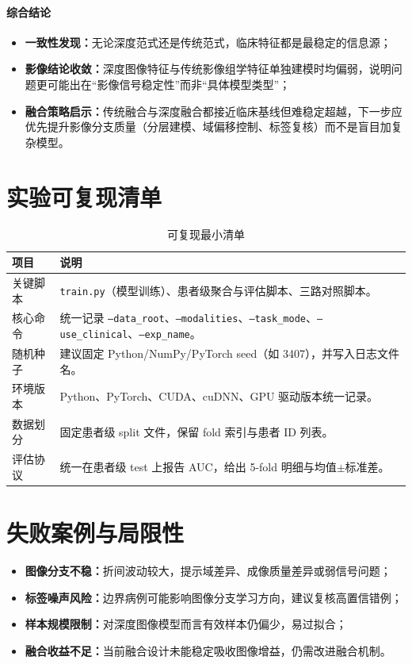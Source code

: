 \documentclass[12pt,a4paper]{ctexart}
\begin{document}
\paragraph{综合结论}
\begin{itemize}
  \item \textbf{一致性发现：}无论深度范式还是传统范式，临床特征都是最稳定的信息源；
  \item \textbf{影像结论收敛：}深度图像特征与传统影像组学特征单独建模时均偏弱，说明问题更可能出在“影像信号稳定性”而非“具体模型类型”；
  \item \textbf{融合策略启示：}传统融合与深度融合都接近临床基线但难稳定超越，下一步应优先提升影像分支质量（分层建模、域偏移控制、标签复核）而不是盲目加复杂模型。
\end{itemize}

\section{实验可复现清单}

\begin{table}[H]
\centering
\caption{可复现最小清单}
\begin{tabular}{p{}p{}}
\toprule
项目 & 说明 \\
\midrule
关键脚本 & \texttt{train.py}（模型训练）、患者级聚合与评估脚本、三路对照脚本。 \\
核心命令 & 统一记录 \texttt{--data\_root}、\texttt{--modalities}、\texttt{--task\_mode}、\texttt{--use\_clinical}、\texttt{--exp\_name}。 \\
随机种子 & 建议固定 Python/NumPy/PyTorch seed（如 3407），并写入日志文件名。 \\
环境版本 & Python、PyTorch、CUDA、cuDNN、GPU 驱动版本统一记录。 \\
数据划分 & 固定患者级 split 文件，保留 fold 索引与患者 ID 列表。 \\
评估协议 & 统一在患者级 test 上报告 AUC，给出 5-fold 明细与均值$\pm$标准差。 \\
\bottomrule
\end{tabular}
\end{table}

\section{失败案例与局限性}

\begin{itemize}
  \item \textbf{图像分支不稳：}折间波动较大，提示域差异、成像质量差异或弱信号问题；
  \item \textbf{标签噪声风险：}边界病例可能影响图像分支学习方向，建议复核高置信错例；
  \item \textbf{样本规模限制：}对深度图像模型而言有效样本仍偏少，易过拟合；
  \item \textbf{融合收益不足：}当前融合设计未能稳定吸收图像增益，仍需改进融合机制。
\end{itemize}
\end{document}
